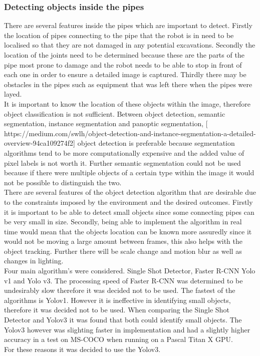 \documentclass[11pt]{article}		%
\begin{document}
		\subsubsection{Detecting objects inside the pipes}
		
		There are several features inside the pipes which are important to detect. 
		Firstly the location of pipes connecting to the pipe that the robot is in need to be localised so that they are not damaged in any potential excavations. 
		Secondly the location of the joints need to be determined because these are the parts of the pipe most prone to damage and the robot needs to be able to stop in front of each one in order to ensure a detailed image is captured. 
		Thirdly there may be obstacles in the pipes such as equipment that was left there when the pipes were layed.
		\\
        It is important to know the location of these objects within the image, therefore object classification is not sufficient. 
        Between object detection, semantic segmentation, instance segmentation and panoptic segmentation, [  https://medium.com/swlh/object-detection-and-instance-segmentation-a-detailed-overview-94ca109274f2] object detection is preferable because segmentation algorithms tend to be more computationally expensive and the added value of pixel labels is not worth it. 
        Further semantic segmentation could not be used because if there were multiple objects of a certain type within the image it would not be possible to distinguish the two.
        \\
        There are several features of the object detection algorithm that are desirable due to the constraints imposed by the environment and the desired outcomes. 
        Firstly it is important to be able to detect small objects since some connecting pipes can be very small in size. 
        Secondly, being able to implement the algorithm in real time would mean that the objects location can be known more assuredly since it would not be moving a large amount between frames, this also helps with the object tracking. 
        Further there will be scale change and motion blur as well as changes in lighting.
        \\
        Four main algorithm’s were considered. 
        Single Shot Detector, Faster R-CNN Yolo v1 and Yolo v3. 
        The processing speed of Faster R-CNN was determined to be undesirably slow therefore it was decided not to be used. 
        The fastest of the algorithms is Yolov1. However it is ineffective in identifying small objects, therefore it was decided not to be used. 
        When comparing the Single Shot Detector and Yolov3 it was found that both could identify small objects. 
        The Yolov3 however was slighting faster in implementation and had a slightly higher accuracy in a test on MS-COCO when running on a Pascal Titan X GPU.
        \\
        For these reasons it was decided to use the Yolov3.
        
\end{document}
